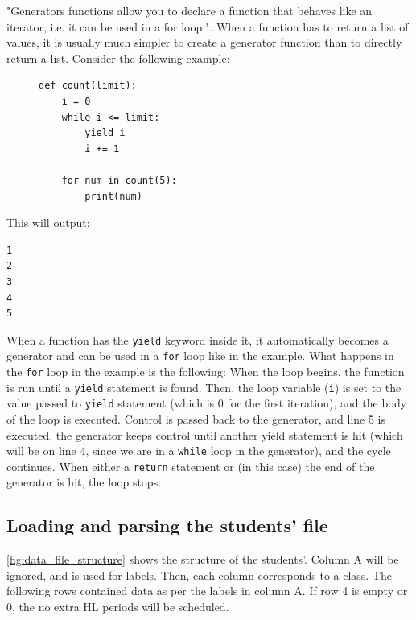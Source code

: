 \documentclass[12pt]{article}
\newcommand{\code}[1]{\texttt{\color{Grey}#1}}
\begin{document}
"Generators functions allow you to declare a function that behaves like an iterator, i.e. it
can be used in a for loop."\autocite{generators}. When a function has to return a list of
values, it is usually much simpler to create a generator function than to directly return a
list. Consider the following example: \vspace{-6mm}
%
\begin{figure}[H]
    \caption{}\vspace{-6mm}
\begin{verbatim}
def count(limit):
    i = 0
    while i <= limit:
        yield i
        i += 1

    for num in count(5):
        print(num)
\end{verbatim}
\end{figure}
%
This will output:\vspace{-5mm}
%
\begin{verbatim}
1
2
3
4
5
\end{verbatim}
%
When a function has the \code{yield} keyword inside it, it automatically becomes a
generator and can be used in a \code{for} loop like in the example. What happens in the
\code{for} loop in the example is the following: When the loop begins, the function is run
until a \code{yield} statement is found. Then, the loop variable (\code{i}) is set to
the value passed to \code{yield} statement (which is 0 for the first iteration), and the
body of the loop is executed. Control is passed back to the generator, and line 5 is
executed, the generator keeps control until another yield statement is hit (which will be on
line 4, since we are in a \code{while} loop in the generator), and the cycle continues.
When either a \code{return} statement or (in this case) the end of the generator is hit,
the loop stops.



\subsection{Loading and parsing the students' file}

\autoref{fig:data_file_structure} shows the structure of the students'. Column A will be
ignored, and is used for labels.  Then, each column corresponds to a class. The following
rows contained data as per the labels in column A. If row 4 is empty or 0, the no extra HL
periods will be scheduled. 
\end{document}
